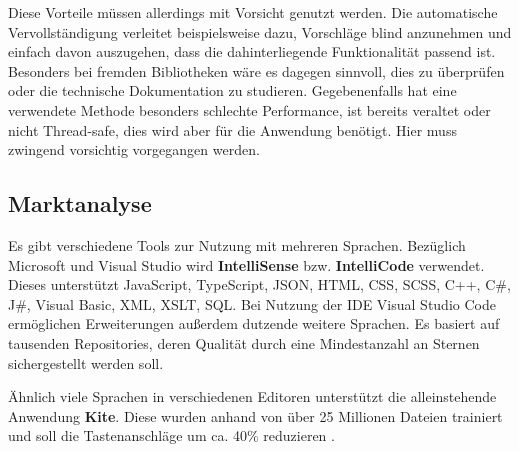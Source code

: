 Diese Vorteile müssen allerdings mit Vorsicht genutzt werden. Die automatische Vervollständigung verleitet beispielsweise dazu, Vorschläge blind anzunehmen und einfach davon auszugehen, dass die dahinterliegende Funktionalität passend ist. Besonders bei fremden Bibliotheken wäre es dagegen sinnvoll, dies zu überprüfen oder die technische Dokumentation zu studieren. Gegebenenfalls hat eine verwendete Methode besonders schlechte Performance, ist bereits veraltet oder nicht Thread-safe, dies wird aber für die Anwendung benötigt. Hier muss zwingend vorsichtig vorgegangen werden.

\subsection{Marktanalyse}
\label{subsec:completion_analyse}
Es gibt verschiedene Tools zur Nutzung mit mehreren Sprachen. Bezüglich Microsoft und Visual Studio wird \textbf{IntelliSense} bzw. \textbf{IntelliCode} verwendet. Dieses unterstützt JavaScript, TypeScript, JSON, HTML, CSS, SCSS, C++, C\#, J\#, Visual Basic, XML, XSLT, SQL. Bei Nutzung der IDE Visual Studio Code ermöglichen Erweiterungen außerdem dutzende weitere Sprachen. Es basiert auf tausenden Repositories, deren Qualität durch eine Mindestanzahl an Sternen sichergestellt werden soll. 

Ähnlich viele Sprachen in verschiedenen Editoren unterstützt die alleinstehende Anwendung \textbf{Kite}. Diese wurden anhand von über 25 Millionen Dateien trainiert und soll die Tastenanschläge um ca. 40\% reduzieren \cite{Kite}. 

